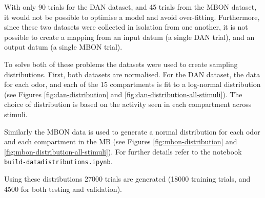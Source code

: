 \documentclass[11pt, A4]{article}
\begin{document}
\begin{multicols}{2}
With only 90 trials for the DAN dataset, and 45 trials from the MBON dataset, it would not be possible to optimise a model and avoid over-fitting. Furthermore, since these two datasets were collected in isolation from one another, it is not possible to create a mapping from an input datum (a single DAN trial), and an output datum (a single MBON trial). 

To solve both of these problems the datasets were used to create sampling distributions. First, both datasets are normalised. For the DAN dataset, the data for each odor, and each of the 15 compartments is fit to a log-normal distribution (see Figures \ref{fig:dan-distribution} and \ref{fig:dan-distribution-all-stimuli}). The choice of distribution is based on the activity seen in each compartment across stimuli.

Similarly the MBON data is used to generate a normal distribution for each odor and each compartment in the MB (see Figures \ref{fig:mbon-distribution} and \ref{fig:mbon-distribution-all-stimuli}). For further details refer to the notebook \texttt{build-datadistributions.ipynb}.	


Using these distributions 27000 trials are generated (18000 training trials, and 4500 for both testing and validation).



\end{multicols}
\end{document}
